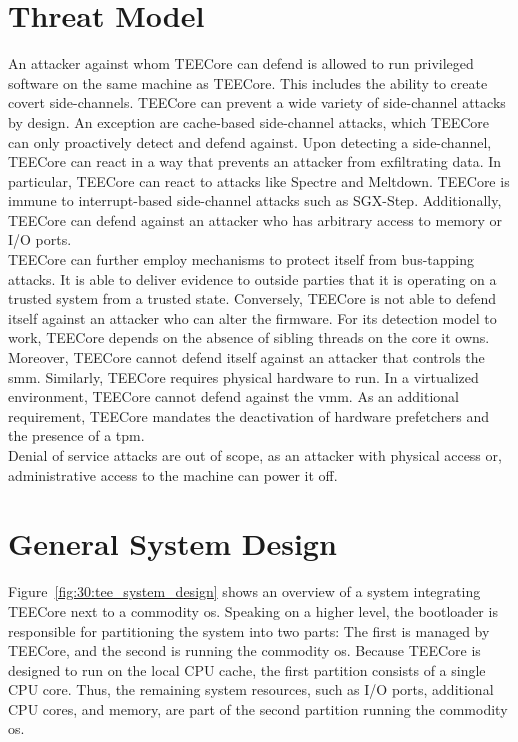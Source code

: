\section{Threat Model}
\label{sec:30:tee_attacker_model}
An attacker against whom TEECore can defend is allowed to run privileged
software on the same machine as TEECore. This includes the ability to create
covert side-channels. TEECore can prevent a wide variety of side-channel attacks
by design. An exception are cache-based side-channel attacks, which TEECore can
only proactively detect and defend against. Upon detecting a side-channel,
TEECore can react in a way that prevents an attacker from exfiltrating data. In
particular, TEECore can react to attacks like Spectre and Meltdown. TEECore is
immune to interrupt-based side-channel attacks such as SGX-Step. Additionally,
TEECore can defend against an attacker who has arbitrary access to memory or I/O
ports. \\

TEECore can further employ mechanisms to protect itself from bus-tapping
attacks. It is able to deliver evidence to outside parties that it is operating
on a trusted system from a trusted state. Conversely, TEECore is not able to
defend itself against an attacker who can alter the firmware. For its detection
model to work, TEECore depends on the absence of sibling threads on the core it
owns. Moreover, TEECore cannot defend itself against an attacker that controls
the \gls{smm}. Similarly, TEECore requires physical hardware to run. In a
virtualized environment, TEECore cannot defend against the \gls{vmm}. As an
additional requirement, TEECore mandates the deactivation of hardware
prefetchers and the presence of a \gls{tpm}.\\

Denial of service attacks are out of scope, as an attacker with physical access
or, administrative access to the machine can power it off.

\section{General System Design}
\label{sec:30:tee_general}
Figure~\ref{fig:30:tee_system_design} shows an overview of a system integrating
TEECore next to a commodity \gls{os}. Speaking on a higher level, the bootloader
is responsible for partitioning the system into two parts: The first is managed
by TEECore, and the second is running the commodity \gls{os}. Because TEECore is
designed to run on the local CPU cache, the first partition consists of a single
CPU core. Thus, the remaining system resources, such as I/O ports, additional
CPU cores, and memory, are part of the second partition running the commodity
\gls{os}.\\

